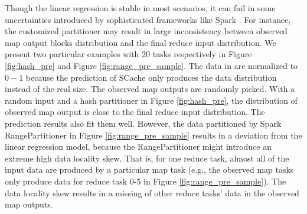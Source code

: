 Though the linear regression is stable in most scenarios, it can fail in some uncertainties introduced by sophisticated frameworks like Spark \cite{apachespark}.  
For instance, the customized partitioner may result in large inconsistency between observed map output blocks distribution and the final reduce input distribution. 
We present two particular examples with 20 tasks respectively in Figure \ref{fig:hash_pre} and Figure \ref{fig:range_pre_sample}. 
The data in are normalized to $0-1$ because the prediction of SCache only produces the data distribution instead of the real size. 
The observed map outputs are randomly picked. 
With a random input and a hash partitioner in Figure \ref{fig:hash_pre}, the distribution of observed map output is close to the final reduce input distribution. 
The prediction results also fit them well. 
However, the data partitioned by Spark RangePartitioner \cite{apachespark} in Figure \ref{fig:range_pre_sample} results in a deviation from the linear regression model, because the RangePartitioner might introduce an extreme high data locality skew. 
That is, for one reduce task, almost all of the input data are produced by a particular map task (e.g., the observed map tasks only produce data for reduce task 0-5 in Figure \ref{fig:range_pre_sample}).
The data locality skew results in a missing of other reduce tasks' data in the observed map outputs.


